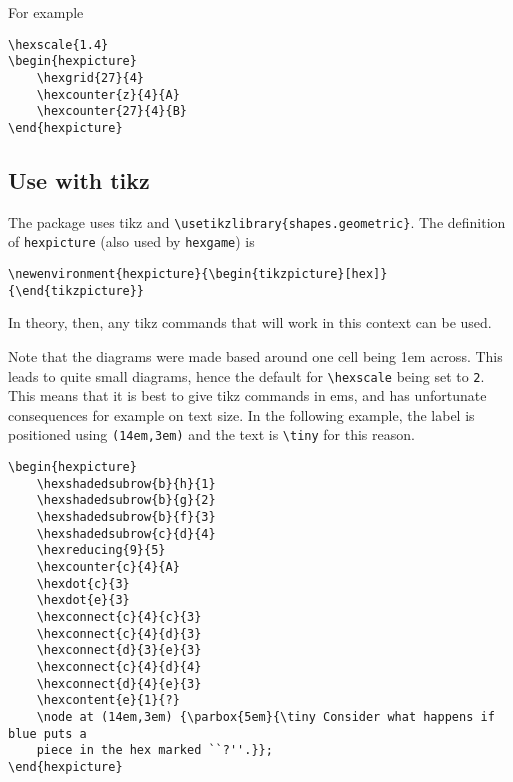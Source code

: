 \documentclass[a4paper,12pt]{article}
\begin{document}
    For example
    
    \begin{verbatim}\hexscale{1.4}
\begin{hexpicture}
    \hexgrid{27}{4}
    \hexcounter{z}{4}{A}
    \hexcounter{27}{4}{B}
\end{hexpicture}\end{verbatim}
    
    \begin{hexpicture}
    \end{hexpicture}
    
    
    \subsection{Use with tikz}
    
    The package uses tikz and \verb|\usetikzlibrary{shapes.geometric}|. The definition of \verb|hexpicture| (also used by \verb|hexgame|) is 
    
    \verb|\newenvironment{hexpicture}{\begin{tikzpicture}[hex]}{\end{tikzpicture}}|
    
    In theory, then, any tikz commands that will work in this context can be used. 
    
    Note that the diagrams were made based around one cell being 1em across. This leads to quite small diagrams, hence the default for \verb|\hexscale| being set to \verb|2|. This means that it is best to give tikz commands in ems, and has unfortunate consequences for example on text size. In the following example, the label is positioned using \verb|(14em,3em)| and the text is \verb|\tiny| for this reason.
    
    \begin{verbatim}\begin{hexpicture}
    \hexshadedsubrow{b}{h}{1}
    \hexshadedsubrow{b}{g}{2}
    \hexshadedsubrow{b}{f}{3}
    \hexshadedsubrow{c}{d}{4}
    \hexreducing{9}{5}
    \hexcounter{c}{4}{A}
    \hexdot{c}{3}
    \hexdot{e}{3}
    \hexconnect{c}{4}{c}{3}
    \hexconnect{c}{4}{d}{3}
    \hexconnect{d}{3}{e}{3}
    \hexconnect{c}{4}{d}{4}
    \hexconnect{d}{4}{e}{3}
    \hexcontent{e}{1}{?}
    \node at (14em,3em) {\parbox{5em}{\tiny Consider what happens if blue puts a 
    piece in the hex marked ``?''.}};
\end{hexpicture}\end{verbatim}
    
\end{document}
